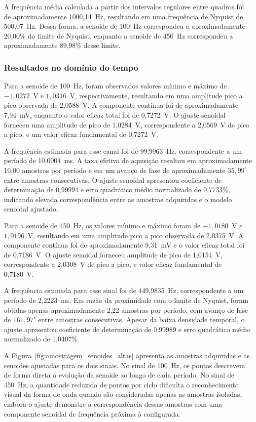 \documentclass[a4paper,12pt]{fcte}
\begin{document}
A frequência média calculada a partir dos intervalos regulares entre quadros foi de aproximadamente 1000,14~Hz, resultando em uma frequência de Nyquist de 500,07~Hz. Dessa forma, a senoide de 100~Hz correspondeu a aproximadamente 20,00\% do limite de Nyquist, enquanto a senoide de 450~Hz correspondeu a aproximadamente 89,98\% desse limite.

\subsubsection{Resultados no domínio do tempo}
\label{subsubsec:senoides_altas_tempo}

Para a senoide de 100~Hz, foram observados valores mínimo e máximo de $-1,0272$~V e $1,0316$~V, respectivamente, resultando em uma amplitude pico a pico observada de 2,0588~V. A componente contínua foi de aproximadamente 7,94~mV, enquanto o valor eficaz total foi de 0,7272~V. O ajuste senoidal forneceu uma amplitude de pico de 1,0284~V, correspondente a 2,0569~V de pico a pico, e um valor eficaz fundamental de 0,7272~V.

A frequência estimada para esse canal foi de 99,9963~Hz, correspondente a um período de 10,0004~ms. A taxa efetiva de aquisição resultou em aproximadamente 10,00 amostras por período e em um avanço de fase de aproximadamente $35,99^{\circ}$ entre amostras consecutivas. O ajuste senoidal apresentou coeficiente de determinação de 0,99994 e erro quadrático médio normalizado de 0,7733\%, indicando elevada correspondência entre as amostras adquiridas e o modelo senoidal ajustado.

Para a senoide de 450~Hz, os valores mínimo e máximo foram de $-1,0180$~V e $1,0196$~V, resultando em uma amplitude pico a pico observada de 2,0375~V. A componente contínua foi de aproximadamente 9,31~mV e o valor eficaz total foi de 0,7186~V. O ajuste senoidal forneceu amplitude de pico de 1,0154~V, correspondente a 2,0308~V de pico a pico, e valor eficaz fundamental de 0,7180~V.

A frequência estimada para esse sinal foi de 449,9835~Hz, correspondente a um período de 2,2223~ms. Em razão da proximidade com o limite de Nyquist, foram obtidas apenas aproximadamente 2,22 amostras por período, com avanço de fase de $161,97^{\circ}$ entre amostras consecutivas. Apesar da baixa densidade temporal, o ajuste apresentou coeficiente de determinação de 0,99989 e erro quadrático médio normalizado de 1,0407\%.

A Figura~\ref{fig:amostragem_senoides_altas} apresenta as amostras adquiridas e as senoides ajustadas para os dois sinais. No sinal de 100~Hz, os pontos descrevem de forma direta a evolução da senoide ao longo de cada período. No sinal de 450~Hz, a quantidade reduzida de pontos por ciclo dificulta o reconhecimento visual da forma de onda quando são consideradas apenas as amostras isoladas, embora o ajuste demonstre a correspondência dessas amostras com uma componente senoidal de frequência próxima à configurada.
\end{document}
